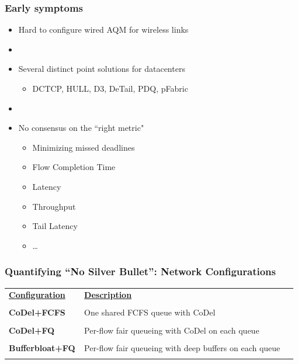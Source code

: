 \begin{frame}[plain]
\frametitle{Early symptoms}
\begin{itemize}
\item{Hard to configure wired AQM for wireless links}

\item[]

\item{Several distinct point solutions for datacenters}
\begin{itemize}
\item DCTCP, HULL, D3, DeTail, PDQ, pFabric
\end{itemize}

\item[]

\item{No consensus on the ``right metric"}
\begin{itemize}
\item Minimizing missed deadlines
\item Flow Completion Time
\item Latency
\item Throughput
\item Tail Latency
\item \dots 
\end{itemize}

\end{itemize}
\end{frame}

\begin{frame}[plain]
\frametitle{Quantifying ``No Silver Bullet'': Network Configurations}
\begin{table}
\begin{tabular}{|p{0.25\linewidth}|p{0.73\linewidth}|}
\hline
{\bf \underline{Configuration}} & {\bf \underline{Description}} \\
&\\
{\bf CoDel+FCFS} & One shared FCFS queue with CoDel\\
& \\
{\bf CoDel+FQ} & Per-flow fair queueing with CoDel on each queue\\ 
&\\
{\bf Bufferbloat+FQ} & Per-flow fair queueing with deep buffers on
each queue\\ 
& \\
\hline
\end{tabular}
\end{table}
\end{frame}

